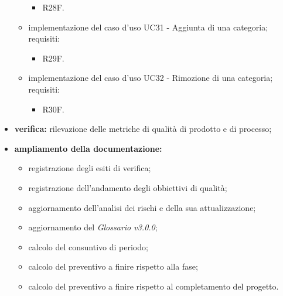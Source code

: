 \begin{itemize}
\begin{itemize}
\begin{itemize}
                        \item R28F.
                    \end{itemize}
              \item implementazione del caso d'uso UC31 -  Aggiunta di una categoria;\\
                    requisiti:
                    \begin{itemize}
                        \item R29F.
                    \end{itemize}
              \item implementazione del caso d'uso UC32 -  Rimozione di una categoria;\\
                    requisiti:
                    \begin{itemize}
                        \item R30F.
                    \end{itemize}
          \end{itemize}
    \item \textbf{verifica:} rilevazione delle metriche di qualità di prodotto e di processo;
    \item \textbf{ampliamento della documentazione:}
          \begin{itemize}
              \item registrazione degli esiti di verifica;
              \item registrazione dell'andamento degli obbiettivi di qualità;
              \item aggiornamento dell'analisi dei rischi e della sua attualizzazione;
              \item aggiornamento del \textit{Glossario v3.0.0};
              \item calcolo del consuntivo di periodo;
              \item calcolo del preventivo a finire rispetto alla fase;
              \item calcolo del preventivo a finire rispetto al completamento del progetto.
          \end{itemize}
\end{itemize}
